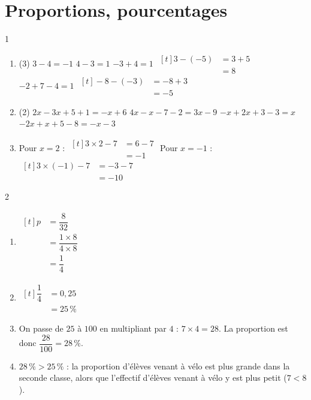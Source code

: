 \documentclass[10pt,a4paper]{article}
\begin{document}

\section{Proportions, pourcentages}

\begin{corr}{1}
\begin{enumerate}[leftmargin=*]
    \item \begin{tasks}(3)
        \task \(3-4=-1\)
        \task \(4-3=1\)
        \task \(-3+4=1\)
        \task \(\begin{aligned}[t] 3-(-5)&=3+5\\ &=8\end{aligned}\)
        \task \(-2+7-4=1\)
        \task \(\begin{aligned}[t] -8-(-3)&=-8+3\\ &=-5\end{aligned}\)
    \end{tasks}
    \item \begin{tasks}(2)
        \task \(2x-3x+5+1=-x+6\)
        \task \(4x-x-7-2=3x-9\)
        \task \(-x+2x+3-3=x\)
        \task \(-2x+x+5-8=-x-3\)
    \end{tasks}
    \item Pour \(x=2\) : \(\begin{aligned}[t] 3\times 2-7&=6-7\\ &=-1\end{aligned}\) \qquad Pour \(x=-1\) : \(\begin{aligned}[t] 3\times(-1)-7&=-3-7\\ &=-10\end{aligned}\)
\end{enumerate}
\end{corr}

\begin{corr}[Guidé]{2}
\begin{enumerate}[leftmargin=*]
    \item \(\begin{aligned}[t] p&=\dfrac{8}{32}\\ &=\dfrac{1\times 8}{4\times 8}\\ &=\dfrac{1}{4}\end{aligned}\)
    \item \(\begin{aligned}[t] \dfrac{1}{4}&=0,25\\ &=25\,\%\end{aligned}\)
    \item On passe de \(25\) à \(100\) en multipliant par \(4\) : \(7\times 4=28\). La proportion est donc \(\dfrac{28}{100}=28\,\%\).
    \item \(28\,\%>25\,\%\) : la proportion d'élèves venant à vélo est plus grande dans la seconde classe, alors que l'effectif d'élèves venant à vélo y est plus petit (\(7<8\)).
\end{enumerate}
\end{corr}
\end{document}

